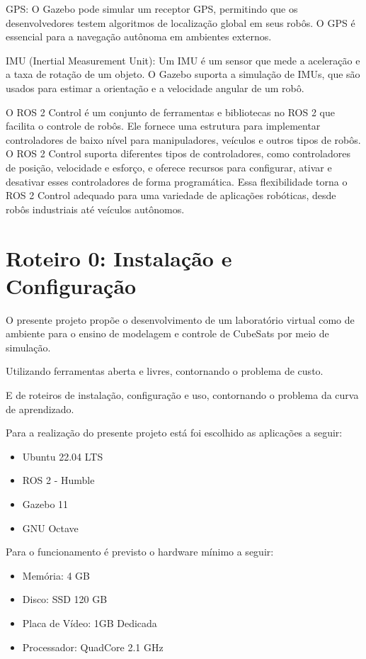 GPS: O Gazebo pode simular um receptor GPS, permitindo que os desenvolvedores testem algoritmos de localização global em seus robôs. O GPS é essencial para a navegação autônoma em ambientes externos.

IMU (Inertial Measurement Unit): Um IMU é um sensor que mede a aceleração e a taxa de rotação de um objeto. O Gazebo suporta a simulação de IMUs, que são usados para estimar a orientação e a velocidade angular de um robô.

O ROS 2 Control é um conjunto de ferramentas e bibliotecas no ROS 2 que facilita o controle de robôs. Ele fornece uma estrutura para implementar controladores de baixo nível para manipuladores, veículos e outros tipos de robôs. O ROS 2 Control suporta diferentes tipos de controladores, como controladores de posição, velocidade e esforço, e oferece recursos para configurar, ativar e desativar esses controladores de forma programática. Essa flexibilidade torna o ROS 2 Control adequado para uma variedade de aplicações robóticas, desde robôs industriais até veículos autônomos.

\section{Roteiro 0: Instalação e Configuração}
    
O presente projeto propõe o desenvolvimento de um laboratório virtual como de ambiente para o ensino de modelagem e controle de CubeSats por meio de simulação.
    
Utilizando ferramentas aberta e livres, contornando o problema de custo.

E de roteiros de instalação, configuração e uso, contornando o problema da curva de aprendizado.

Para a realização do presente projeto está foi escolhido as aplicações a seguir:

\begin{itemize}
    \item Ubuntu 22.04 LTS
    \item ROS 2 - Humble
    \item Gazebo 11
    \item GNU Octave
\end{itemize}

Para o funcionamento é previsto o hardware mínimo a seguir:

\begin{itemize}
    \item Memória: 4 GB
    \item Disco: SSD 120 GB
    \item Placa de Vídeo: 1GB Dedicada
    \item Processador: QuadCore 2.1 GHz
\end{itemize}

